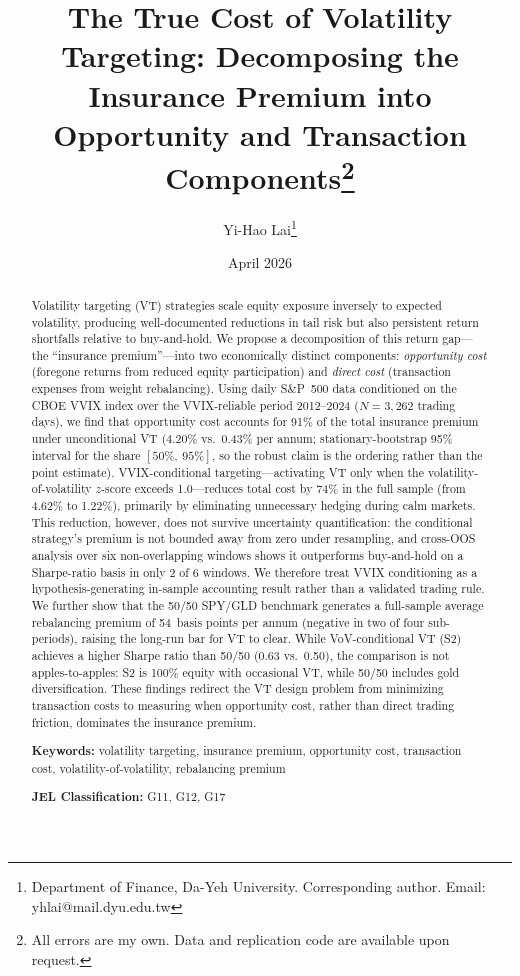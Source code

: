 \documentclass[12pt,a4paper]{article}
\title{The True Cost of Volatility Targeting: Decomposing the Insurance Premium into Opportunity and Transaction Components\thanks{All errors are my own. Data and replication code are available upon request.}}
\author{Yi-Hao Lai\thanks{Department of Finance, Da-Yeh University. Corresponding author. Email: yhlai@mail.dyu.edu.tw}}
\date{April 2026}
\begin{document}
\maketitle

\begin{abstract}
\noindent
Volatility targeting (VT) strategies scale equity exposure inversely to expected volatility, producing well-documented reductions in tail risk but also persistent return shortfalls relative to buy-and-hold. We propose a decomposition of this return gap---the ``insurance premium''---into two economically distinct components: \emph{opportunity cost} (foregone returns from reduced equity participation) and \emph{direct cost} (transaction expenses from weight rebalancing). Using daily S\&P~500 data conditioned on the CBOE VVIX index over the VVIX-reliable period 2012--2024 ($N=3{,}262$ trading days), we find that opportunity cost accounts for 91\% of the total insurance premium under unconditional VT (4.20\% vs.\ 0.43\% per annum; stationary-bootstrap 95\% interval for the share $[50\%,\ 95\%]$, so the robust claim is the ordering rather than the point estimate). VVIX-conditional targeting---activating VT only when the volatility-of-volatility $z$-score exceeds 1.0---reduces total cost by 74\% in the full sample (from 4.62\% to 1.22\%), primarily by eliminating unnecessary hedging during calm markets. This reduction, however, does not survive uncertainty quantification: the conditional strategy's premium is not bounded away from zero under resampling, and cross-OOS analysis over six non-overlapping windows shows it outperforms buy-and-hold on a Sharpe-ratio basis in only 2 of 6 windows. We therefore treat VVIX conditioning as a hypothesis-generating in-sample accounting result rather than a validated trading rule. We further show that the 50/50 SPY/GLD benchmark generates a full-sample average rebalancing premium of 54~basis points per annum (negative in two of four sub-periods), raising the long-run bar for VT to clear. While VoV-conditional VT (S2) achieves a higher Sharpe ratio than 50/50 (0.63 vs.\ 0.50), the comparison is not apples-to-apples: S2 is 100\% equity with occasional VT, while 50/50 includes gold diversification. These findings redirect the VT design problem from minimizing transaction costs to measuring when opportunity cost, rather than direct trading friction, dominates the insurance premium.

\medskip
\noindent
\textbf{Keywords:} volatility targeting, insurance premium, opportunity cost, transaction cost, volatility-of-volatility, rebalancing premium

\medskip
\noindent
\textbf{JEL Classification:} G11, G12, G17
\end{abstract}
\end{document}
